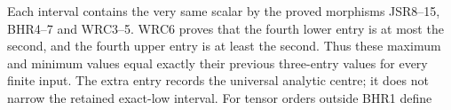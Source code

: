 Each interval contains the very same scalar by the
proved morphisms JSR8--15, BHR4--7 and WRC3--5.
WRC6 proves that the fourth lower entry is at most the
second, and the fourth upper entry is at least the second.
Thus these maximum and minimum values equal exactly
their previous three-entry values for every finite input.
The extra entry records the universal analytic centre;
it does not narrow the retained exact-low interval.
For tensor orders outside BHR1 define
